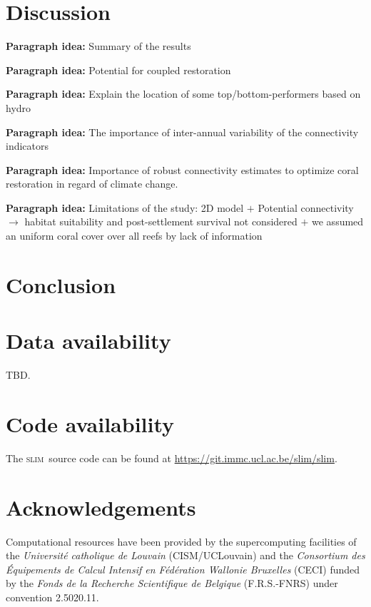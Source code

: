 \documentclass[preprint,12pt,authoryear]{elsarticle}
\newcommand{\slim}{\textsc{slim}\ }
\begin{document}

\section*{Discussion}

\textbf{Paragraph idea:} Summary of the results

\textbf{Paragraph idea:} Potential for coupled restoration

\textbf{Paragraph idea:} Explain the location of some top/bottom-performers based on hydro

\textbf{Paragraph idea:} The importance of inter-annual variability of the connectivity indicators

\textbf{Paragraph idea:} Importance of robust connectivity estimates to optimize coral restoration in regard of climate change.

\textbf{Paragraph idea:} Limitations of the study: 2D model $+$ Potential connectivity $\rightarrow$ habitat suitability and post-settlement survival not considered $+$ we assumed an uniform coral cover over all reefs by lack of information


\section*{Conclusion}

\lipsum[1-1]


\section*{Data availability}

TBD.

\section*{Code availability}

The \slim source code can be found at \href{https://git.immc.ucl.ac.be/slim/slim}{https://git.immc.ucl.ac.be/slim/slim}.

\section*{Acknowledgements}

Computational resources have been provided by the supercomputing facilities of the \textit{Universit\'e catholique de Louvain} (CISM/UCLouvain) and the \textit{Consortium des \'Equipements de Calcul Intensif en F\'ed\'eration Wallonie Bruxelles} (CECI) funded by the \textit{Fonds de la Recherche Scientifique de Belgique} (F.R.S.-FNRS) under convention 2.5020.11.
\end{document}
